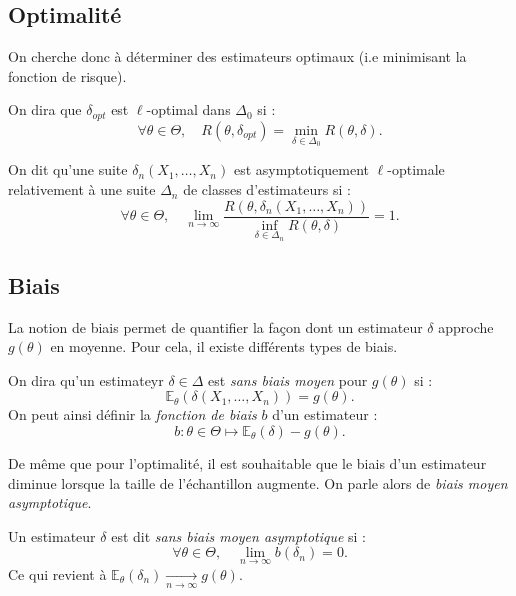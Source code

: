 \subsection{Optimalité}

On cherche donc à déterminer des estimateurs optimaux (i.e minimisant la fonction 
de risque). 

\begin{definition}
    On dira que $ \delta_{opt}$ est $\ell$-optimal dans $ \Delta_0$ si : 
        $$ \forall \theta \in \Theta, \quad R( \theta, \delta_{opt}) = \min_{ \delta \in \Delta_0} R( \theta, \delta). $$ 
\end{definition}

\begin{definition}
    On dit qu'une suite $ \delta_n(X_1, \dots, X_n)$ est asymptotiquement 
    $\ell$-optimale relativement à une suite $ \Delta_n$ de classes d'estimateurs si : 
        $$ \forall \theta \in \Theta, \quad \lim_{n \to \infty} 
        \frac{R(\theta, \delta_n(X_1, \dots, X_n))}{\displaystyle\inf_{ \delta \in \Delta_n} R(\theta, \delta)} = 1. $$
\end{definition}

\subsection{Biais}

La notion de biais permet de quantifier la façon dont un estimateur $ \delta$ approche 
$ g(\theta)$ en moyenne. Pour cela, il existe différents types de biais. 

\begin{definition}
    On dira qu'un estimateyr $ \delta \in \Delta$ est \emph{sans biais moyen} pour $g(\theta)$ 
    si : 
        $$ \mathbb{E}_\theta( \delta(X_1, \dots, X_n)) = g(\theta).$$ 
    On peut ainsi définir la \emph{fonction de biais} $b$ d'un estimateur : 
        $$ 
            b : \theta \in \Theta \longmapsto \mathbb{E}_\theta(\delta) - g(\theta). 
        $$ 
\end{definition}

De même que pour l'optimalité, il est souhaitable que le biais d'un estimateur 
diminue lorsque la taille de l'échantillon augmente. On parle alors de \emph{biais moyen asymptotique}. 

\begin{definition}
    Un estimateur $ \delta$ est dit \emph{sans biais moyen asymptotique} si : 
        $$ \forall \theta \in \Theta, \quad 
            \lim_{n \to \infty} b(\delta_n) = 0. $$
    Ce qui revient à $ \mathbb{E}_\theta( \delta_n) \underset{n \to \infty}{\longrightarrow} g(\theta)$. 
\end{definition}

